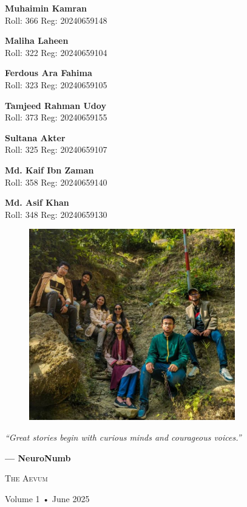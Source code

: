 \documentclass[a4paper,10pt,twocolumn]{memoir}
\newcommand{\contributor}[4]{%
  \vspace{0.4em}
  \begin{minipage}{\textwidth}
    \textbf{\normalsize #1}\\
    {\footnotesize Roll: #2 \quad Reg: #3}\\
    {\footnotesize\color{gray}#4}
  \end{minipage}
}
\begin{document}
\contributor{Muhaimin Kamran}{366}{20240659148}{}
\contributor{Maliha Laheen}{322}{20240659104}{}
\contributor{Ferdous Ara Fahima}{323}{20240659105}{}
\contributor{Tamjeed Rahman Udoy}{373}{20240659155}{}
\contributor{Sultana Akter}{325}{20240659107}{}
\contributor{Md. Kaif Ibn Zaman}{358}{20240659140}{}
\contributor{Md. Asif Khan}{348}{20240659130}{}


\begin{figure}[ht]
  \hspace{2.0cm}
  \includegraphics[width=0.8\textwidth]{group_photo.jpg}
\end{figure}

\clearpage
\thispagestyle{empty}
\begin{center}
\begin{minipage}{\textwidth}
\centering
\vspace*{\fill}
\vspace{8.5cm}

{\Large\itshape\color{primary}``Great stories begin with curious minds and courageous voices.''}

\vspace{0.8em} %
{\large\bfseries\color{dark}— NeuroNumb}

\vspace{1.5cm} %

\vspace{0.8em} %
{\large\scshape\color{dark}The Aevum}

\vspace{0.3em} %
{\small\color{gray}Volume 1 • June 2025}

\vspace{0.3em} %

\vspace*{\fill}
\end{minipage}
\end{center}
\end{document}
